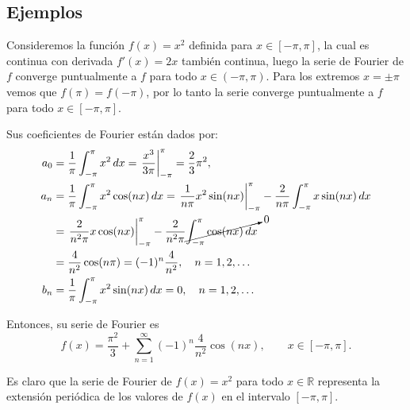 

\subsection{Ejemplos}

\begin{ejemplo} \label{EjemploFourier1}
Consideremos la función $f(x) = x^2$ definida para $x\in [-\pi,\pi]$, la cual es continua con derivada $f'(x) = 2x$ también continua, luego la serie de Fourier de $f$ converge puntualmente a $f$ para todo $x \in (-\pi,\pi)$. Para los extremos $x = \pm \pi$ vemos que $f(\pi) = f(-\pi)$, por lo tanto la serie converge puntualmente a $f$ para todo $x \in [-\pi,\pi]$.

Sus coeficientes de Fourier están dados por:
\begin{align*}
    a_0 &= \frac{1}{\pi} \int_{-\pi}^{\pi} x^2 \,dx = \left. \frac{x^3}{3\pi} \right|_{-\pi}^{\pi} = \frac{2}{3} \pi^2, \\
    a_n &= \frac{1}{\pi} \int_{-\pi}^{\pi} x^2 \cos(n x)\,dx =   \left. \frac{1}{n\pi} x^2 \sin(nx)  \right|_{-\pi}^{\pi} - \frac{2}{n\pi} \int_{-\pi}^{\pi} x \sin(nx) \,dx\\
    &= \left.   \frac{2}{n^2\pi} x \cos(nx)\right|_{-\pi}^{\pi} - \frac{2}{n^2 \pi} \cancelto{0}{\int_{-\pi}^{\pi} \cos(nx) \,dx }\\
    &=  \frac{4}{n^2} \cos(n\pi) =  (-1)^n \frac{4}{n^2}, \quad n = 1,2,\dots\\
     b_n &= \frac{1}{\pi} \int_{-\pi}^{\pi} x^2 \sin(nx)\,dx = 0, \quad n = 1,2, \dots
\end{align*}

Entonces, su serie de Fourier es
\begin{equation}
f(x) = \frac{\pi^2}{3} + \sum_{n=1}^{\infty} (-1)^n \frac{4}{n^2} \cos(nx), \qquad x \in [-\pi,\pi].    \label{FourierCuadratica}
\end{equation}

Es claro que la serie de Fourier de $f(x) = x^2$ para todo $x\in \mathbb{R}$ representa la extensión periódica de los valores de $f(x)$ en el intervalo $[-\pi,\pi]$.


\end{ejemplo}
